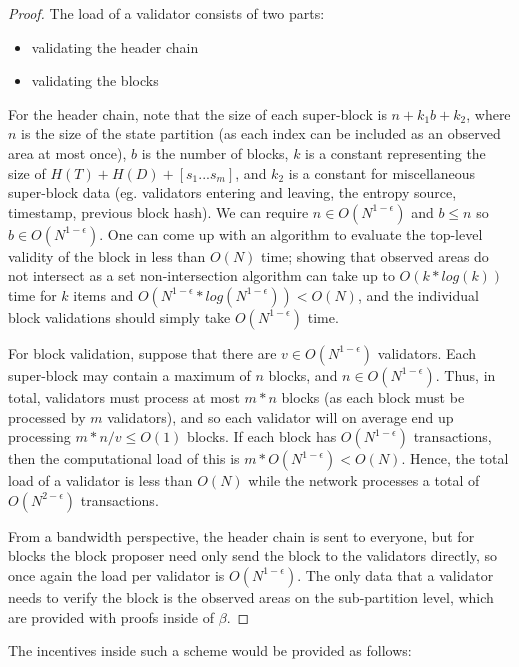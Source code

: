 \documentclass[11pt,a4paper]{report}
\theoremstyle{plain}
\theoremstyle{definition}
\theoremstyle{remark}
\begin{document}
\begin{proof}
The load of a validator consists of two parts:

\begin{itemize}
\item
validating the header chain
\item
validating the blocks
\end{itemize}

For the header chain, note that the size of each super-block is $n+k_1b+k_2$, where $n$ is the size of the state partition (as each index can be included as an observed area at most once), $b$ is the number of blocks, $k$ is a constant representing the size of $H(T) + H(D) + [s_1 ... s_m]$, and $k_2$ is a constant for miscellaneous super-block data (eg. validators entering and leaving, the entropy source, timestamp, previous block hash). We can require $n \in O(N^{1-\epsilon})$ and $b \le n$ so $b \in O(N^{1-\epsilon})$. One can come up with an algorithm to evaluate the top-level validity of the block in less than $O(N)$ time; showing that observed areas do not intersect as a set non-intersection algorithm can take up to $O(k*log(k))$ time for $k$ items and $O(N^{1-\epsilon} * log(N^{1-\epsilon})) < O(N)$, and the individual block validations should simply take $O(N^{1-\epsilon})$ time.

For block validation, suppose that there are $v \in O(N^{1-\epsilon})$ validators. Each super-block may contain a maximum of $n$ blocks, and $n \in O(N^{1-\epsilon})$. Thus, in total, validators must process at most $m*n$ blocks (as each block must be processed by $m$ validators), and so each validator will on average end up processing $m*n/v \le O(1)$ blocks. If each block has $O(N^{1-\epsilon})$ transactions, then the computational load of this is $m * O(N^{1-\epsilon}) < O(N)$. Hence, the total load of a validator is less than $O(N)$ while the network processes a total of $O(N^{2-\epsilon})$ transactions.

From a bandwidth perspective, the header chain is sent to everyone, but for blocks the block proposer need only send the block to the validators directly, so once again the load per validator is $O(N^{1-\epsilon})$. The only data that a validator needs to verify the block is the observed areas on the sub-partition level, which are provided with proofs inside of $\beta$.
\end{proof}

The incentives inside such a scheme would be provided as follows:
\end{document}
